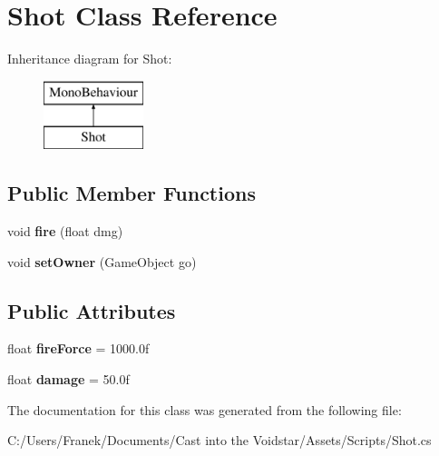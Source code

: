 \hypertarget{class_shot}{}\section{Shot Class Reference}
\label{class_shot}
Inheritance diagram for Shot\+:\begin{figure}[H]
\begin{center}
\leavevmode
\includegraphics[height=2.000000cm]{class_shot}
\end{center}
\end{figure}
\subsection*{Public Member Functions}
\begin{DoxyCompactItemize}
\item 
\hypertarget{class_shot_a1c90a6a43a28389266ab330a1d5cce39}{}void {\bfseries fire} (float dmg)\label{class_shot_a1c90a6a43a28389266ab330a1d5cce39}

\item 
\hypertarget{class_shot_a19a65826fd2946bf518662f13ace77d9}{}void {\bfseries set\+Owner} (Game\+Object go)\label{class_shot_a19a65826fd2946bf518662f13ace77d9}

\end{DoxyCompactItemize}
\subsection*{Public Attributes}
\begin{DoxyCompactItemize}
\item 
\hypertarget{class_shot_ab122de347dcdf571ce02344e0900bc6b}{}float {\bfseries fire\+Force} = 1000.\+0f\label{class_shot_ab122de347dcdf571ce02344e0900bc6b}

\item 
\hypertarget{class_shot_a45f3d0367ce3e6dc6025e2a771256c35}{}float {\bfseries damage} = 50.\+0f\label{class_shot_a45f3d0367ce3e6dc6025e2a771256c35}

\end{DoxyCompactItemize}


The documentation for this class was generated from the following file\+:\begin{DoxyCompactItemize}
\item 
C\+:/\+Users/\+Franek/\+Documents/\+Cast into the Voidstar/\+Assets/\+Scripts/Shot.\+cs\end{DoxyCompactItemize}
